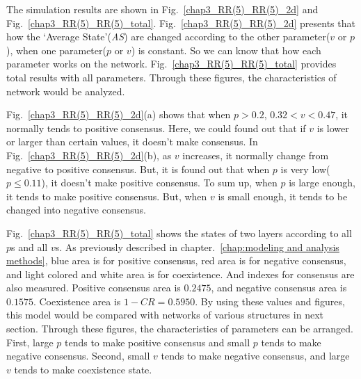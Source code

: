 The simulation results are shown in Fig.~\ref{chap3_RR(5)_RR(5)_2d} and Fig.~\ref{chap3_RR(5)_RR(5)_total}.  Fig.~\ref{chap3_RR(5)_RR(5)_2d} presents that how the `Average State'(\textit{AS}) are changed according to the other parameter($v$ or $p$), when one parameter($p$ or $v$) is constant. So we can know that how each parameter works on the network. Fig.~\ref{chap3_RR(5)_RR(5)_total} provides total results with all parameters. Through these figures, the characteristics of network would be analyzed.

Fig.~\ref{chap3_RR(5)_RR(5)_2d}(a) shows that when $p > 0.2$, $0.32 < v < 0.47$, it normally tends to positive consensus. Here, we could found out that if $v$ is lower or larger than certain values, it doesn't make consensus. In Fig.~\ref{chap3_RR(5)_RR(5)_2d}(b), as $v$ increases, it normally change from negative to positive consensus. But, it is found out that when $p$ is very low($p \le 0.11$), it doesn't make positive consensus.  To sum up, when $p$ is large enough, it tends to make positive consensus. But, when $v$ is small enough, it tends to be changed into negative consensus.

Fig.~\ref{chap3_RR(5)_RR(5)_total} shows the states of two layers according to all $p$s and all $v$s. As previously described in chapter.~\ref{chap:modeling and analysis methods}, blue area is for positive consensus, red area is for negative consensus, and light colored and white area is for coexistence. And indexes for consensus are also measured. Positive consensus area is $0.2475$, and negative consensus area is $0.1575$. Coexistence area is $1 - CR = 0.5950$. By using these values and figures, this model would be compared with networks of various structures in next section. Through these figures, the characteristics of parameters can be arranged. First, large $p$ tends to make positive consensus and small $p$ tends to make negative consensus. Second, small $v$ tends to make negative consensus, and large $v$ tends to make coexistence state. 

